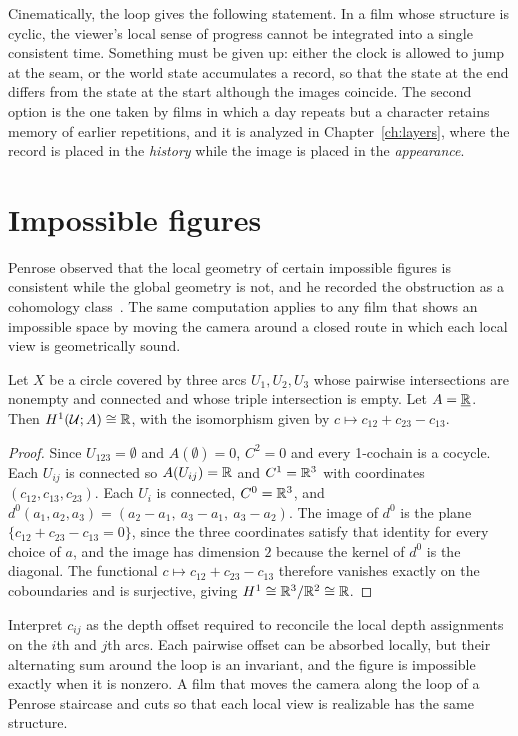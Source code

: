 Cinematically, the loop gives the following statement. In a film whose structure is cyclic, the viewer's local sense of progress cannot be integrated into a single consistent time. Something must be given up: either the clock is allowed to jump at the seam, or the world state accumulates a record, so that the state at the end differs from the state at the start although the images coincide. The second option is the one taken by films in which a day repeats but a character retains memory of earlier repetitions, and it is analyzed in Chapter~\ref{ch:layers}, where the record is placed in the \emph{history} while the image is placed in the \emph{appearance}.

\section{Impossible figures}

Penrose observed that the local geometry of certain impossible figures is consistent while the global geometry is not, and he recorded the obstruction as a cohomology class~\cite{penrose1992}. The same computation applies to any film that shows an impossible space by moving the camera around a closed route in which each local view is geometrically sound.

\begin{proposition}\label{prop:tribar}
Let $X$ be a circle covered by three arcs $U_1,U_2,U_3$ whose pairwise intersections are nonempty and connected and whose triple intersection is empty. Let $A=\underline{\mathbb{R}}$. Then $H^1(\mathcal{U};A)\cong\mathbb{R}$, with the isomorphism given by $c\mapsto c_{12}+c_{23}-c_{13}$.
\end{proposition}

\begin{proof}
Since $U_{123}=\emptyset$ and $A(\emptyset)=0$, $C^2=0$ and every 1-cochain is a cocycle. Each $U_{ij}$ is connected so $A(U_{ij})=\mathbb{R}$ and $C^1=\mathbb{R}^3$ with coordinates $(c_{12},c_{13},c_{23})$. Each $U_i$ is connected, $C^0=\mathbb{R}^3$, and $d^0(a_1,a_2,a_3)=(a_2-a_1,\ a_3-a_1,\ a_3-a_2)$. The image of $d^0$ is the plane $\{c_{12}+c_{23}-c_{13}=0\}$, since the three coordinates satisfy that identity for every choice of $a$, and the image has dimension $2$ because the kernel of $d^0$ is the diagonal. The functional $c\mapsto c_{12}+c_{23}-c_{13}$ therefore vanishes exactly on the coboundaries and is surjective, giving $H^1\cong\mathbb{R}^3/\mathbb{R}^2\cong\mathbb{R}$.
\end{proof}

Interpret $c_{ij}$ as the depth offset required to reconcile the local depth assignments on the $i$th and $j$th arcs. Each pairwise offset can be absorbed locally, but their alternating sum around the loop is an invariant, and the figure is impossible exactly when it is nonzero. A film that moves the camera along the loop of a Penrose staircase and cuts so that each local view is realizable has the same structure.


